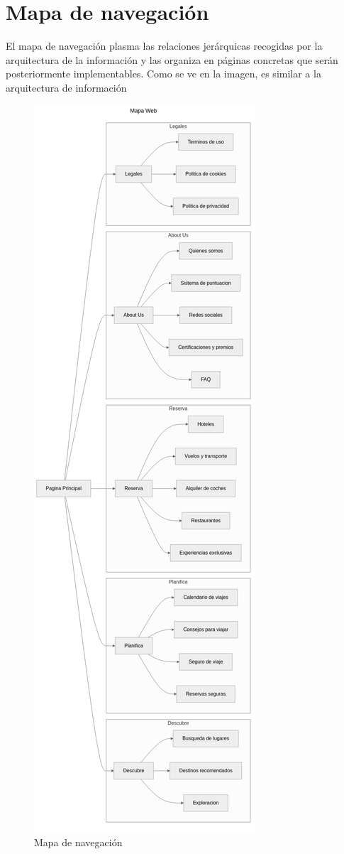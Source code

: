 \documentclass[11pt, a4paper]{book}
\begin{document}
	
	
	\section{Mapa de navegación}
	El mapa de navegación plasma las relaciones jerárquicas recogidas por la arquitectura de la información y las organiza en páginas concretas que serán posteriormente implementables. Como se ve en la imagen, es similar a la arquitectura de información
	
	\begin{figure} [H]
		\centering
		\includegraphics[height=0.8\textheight]{mapa_web.png}
		\caption{Mapa de navegación}
	\end{figure}
	
\end{document}
